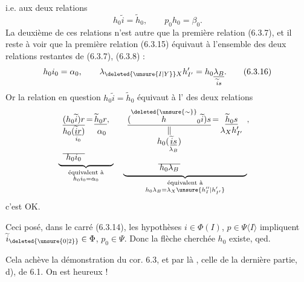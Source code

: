 i.e. aux deux relations
\[
 h_0\widetilde i=\widetilde h_0,\qquad p_0h_0=\beta_0.\tag*{(6.3.15)}
\]
La deuxième de ces relations n'est autre que
la première relation (6.3.7), et il reste à
voir que  la première relation (6.3.15)
équivaut à l'ensemble des deux relations
restantes de (6.3.7), (6.3.8) :
\[
 h_0i_0=\alpha_0,\qquad \lambda_{\deleted{\unsure{I|Y}}X}h'_{I'}=h_0\underset{\widetilde i s}{\underline{\lambda_B}}.\tag*{(6.3.16)}
\]
Or la relation en question $h_0\widetilde i=\widetilde h_0$ équivaut
à l' des deux relations
\[
\begin{aligned}
&\underbrace{\begin{array}[t]{c@{\,}c@{\,}c}
 \underline{(h_0\widetilde i)r}&=&\underline{\widetilde h_0 r},\\
 h_0(\underset{i_0}{\underline{\widetilde i r}})&&\alpha_0\\
 \underline{\phantom{h_0(\widetilde i r)}}&&\\[-2pt]
 h_0i_0&&
\end{array}}_{\substack{\text{équivalent à}\\ h_0i_0=\alpha_0}}
\quad
\underbrace{\begin{array}[t]{c@{\,}c@{\,}c}
 \underline{(\overset{\deleted{\unsure{\sim}}}{h}_0\widetilde i)s}&=&\underline{\widetilde h_0 s}\\
 \Vert&&\lambda_Xh'_{I'}\\
 h_0(\underset{\lambda_B}{\underline{\widetilde i s}})&&\\
 \underline{\phantom{h_0(\widetilde i s)}}&&\\[-2pt]
 h_0\lambda_B&&
\end{array}}_{\substack{\text{équivalent à}\\ h_0\lambda_B=\lambda_X \unsure{h''_I|h'_{I'}}}},
\end{aligned}
\]
c'est OK.

Ceci posé, dans le carré (6.3.14), les
hypothèses $i\in\Phi(I)$, $p\in\Psi\langle I\rangle$ impliquent
$\widetilde i_{\deleted{\unsure{0|2}}}\in\Phi$, $p_0\in\Psi$. Donc la flèche cherchée
$h_0$ existe, qed.

Cela achève la démonstration du cor. 6.3,
et par là , celle de la dernière
partie, d), de 6.1. On est heureux !

